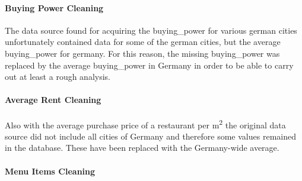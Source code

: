 \paragraph{Buying Power Cleaning}
The data source found for acquiring the buying\_power for various german cities unfortunately contained data for some of the german cities,
but the average buying\_power for germany.
For this reason, the missing buying\_power was replaced by the average buying\_power in Germany in order to be able to carry out at least a rough analysis.
\paragraph{Average Rent Cleaning}
Also with the average purchase price of a restaurant per m\textsuperscript{2} the original data source did not include all cities of Germany and therefore
some  values remained in the database.
These have been replaced with the Germany-wide average.
\paragraph{Menu Items Cleaning}
